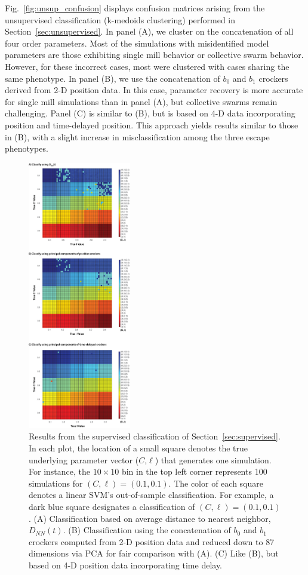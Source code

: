 \documentclass[%
 aip,
reprint,
 amsmath,amssymb,
 aps,
showkeys
]{revtex4-1}
\begin{document}
Fig.~\ref{fig:unsup_confusion} displays confusion matrices arising from the unsupervised classification (k-medoids clustering) performed in Section~\ref{sec:unsupervised}. In panel (A), we cluster on the concatenation of all four order parameters. Most of the simulations with misidentified model parameters are those exhibiting single mill behavior or collective swarm behavior. However, for these incorrect cases, most were clustered with cases sharing the same phenotype. In panel (B), we use the concatenation of $b_0$ and $b_1$ crockers derived from 2-D position data. In this case, parameter recovery is more accurate for single mill simulations than in panel (A), but collective swarms remain challenging. Panel (C) is similar to (B), but is based on 4-D data incorporating position and time-delayed position. This approach yields results similar to those in (B), with a slight increase in misclassification among the three escape phenotypes. 

\begin{figure}
    \centering
    \includegraphics[width=0.4\textwidth]{sup_classification.png}
    \caption{Results from the supervised classification of Section~\ref{sec:supervised}. In each plot, the location of a small square denotes the true underlying parameter vector ($C$,$\ell$) that generates one simulation. For instance, the $10 \times 10$ bin in the top left corner represents 100 simulations for $(C,\ell)= (0.1,0.1)$. The color of each square denotes a linear SVM's out-of-sample classification. For example, a dark blue square designates a classification of $(C,\ell)= (0.1,0.1)$. (A) Classification based on average distance to nearest neighbor, $D_{NN}(t)$. (B) Classification using the concatenation of $b_0$ and $b_1$ crockers computed from 2-D position data and reduced down to 87 dimensions via PCA for fair comparison with (A). (C) Like (B), but based on 4-D position data incorporating time delay.}
    \label{fig:supervised_plots}
\end{figure}
\end{document}
